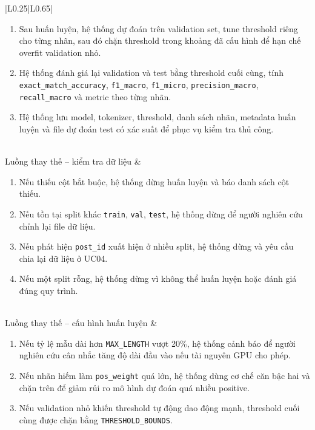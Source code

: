 \begin{longtable}{|L{0.25\textwidth}|L{0.65\textwidth}|}
\begin{minipage}[t]{\linewidth}
\begin{enumerate}[label=\textbf{Bước \arabic*:}, leftmargin=1.55cm, itemsep=0pt, topsep=0pt]
    \item Sau huấn luyện, hệ thống dự đoán trên validation set, tune threshold riêng cho từng nhãn, sau đó chặn threshold trong khoảng đã cấu hình để hạn chế overfit validation nhỏ.
    \item Hệ thống đánh giá lại validation và test bằng threshold cuối cùng, tính \texttt{exact\_match\_accuracy}, \texttt{f1\_macro}, \texttt{f1\_micro}, \texttt{precision\_macro}, \texttt{recall\_macro} và metric theo từng nhãn.
    \item Hệ thống lưu model, tokenizer, threshold, danh sách nhãn, metadata huấn luyện và file dự đoán test có xác suất để phục vụ kiểm tra thủ công.
\end{enumerate}
\end{minipage} \\ \hline
Luồng thay thế -- kiểm tra dữ liệu &
\begin{minipage}[t]{\linewidth}
\begin{enumerate}[label=\textbf{Bước \arabic*:}, leftmargin=1.55cm, itemsep=0pt, topsep=0pt]
    \item Nếu thiếu cột bắt buộc, hệ thống dừng huấn luyện và báo danh sách cột thiếu.
    \item Nếu tồn tại split khác \texttt{train}, \texttt{val}, \texttt{test}, hệ thống dừng để người nghiên cứu chỉnh lại file dữ liệu.
    \item Nếu phát hiện \texttt{post\_id} xuất hiện ở nhiều split, hệ thống dừng và yêu cầu chia lại dữ liệu ở UC04.
    \item Nếu một split rỗng, hệ thống dừng vì không thể huấn luyện hoặc đánh giá đúng quy trình.
\end{enumerate}
\end{minipage} \\ \hline
Luồng thay thế -- cấu hình huấn luyện &
\begin{minipage}[t]{\linewidth}
\begin{enumerate}[label=\textbf{Bước \arabic*:}, leftmargin=1.55cm, itemsep=0pt, topsep=0pt]
    \item Nếu tỷ lệ mẫu dài hơn \texttt{MAX\_LENGTH} vượt 20\%, hệ thống cảnh báo để người nghiên cứu cân nhắc tăng độ dài đầu vào nếu tài nguyên GPU cho phép.
    \item Nếu nhãn hiếm làm \texttt{pos\_weight} quá lớn, hệ thống dùng cơ chế căn bậc hai và chặn trên để giảm rủi ro mô hình dự đoán quá nhiều positive.
    \item Nếu validation nhỏ khiến threshold tự động dao động mạnh, threshold cuối cùng được chặn bằng \texttt{THRESHOLD\_BOUNDS}.

\end{enumerate}
\end{minipage}
\end{longtable}
